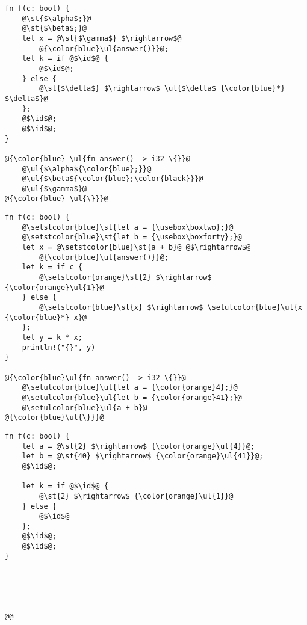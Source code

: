 \documentclass[a4paper,11pt]{article}
\newcommand\id{\square}
\begin{document}
\noindent
\begin{minipage}{.32\textwidth}
\begin{lstlisting}[rulecolor=\color{blue!20}]
fn f(c: bool) {
    @\st{$\alpha$;}@
    @\st{$\beta$;}@
    let x = @\st{$\gamma$} $\rightarrow$@
        @{\color{blue}\ul{answer()}}@;
    let k = if @$\id$@ {
        @$\id$@;
    } else {
        @\st{$\delta$} $\rightarrow$ \ul{$\delta$ {\color{blue}*} $\delta$}@
    };
    @$\id$@;
    @$\id$@;
}

@{\color{blue} \ul{fn answer() -> i32 \{}}@
    @\ul{$\alpha${\color{blue};}}@
    @\ul{$\beta${\color{blue};\color{black}}}@
    @\ul{$\gamma$}@
@{\color{blue} \ul{\}}}@
\end{lstlisting}
\end{minipage}\hfill
\begin{minipage}{.32\textwidth}
\newbox\boxtwo
\sbox{}
\newbox\boxforty
\sbox{}
\begin{lstlisting}
fn f(c: bool) {
    @\setstcolor{blue}\st{let a = {\usebox\boxtwo};}@
    @\setstcolor{blue}\st{let b = {\usebox\boxforty};}@
    let x = @\setstcolor{blue}\st{a + b}@ @$\rightarrow$@
        @{\color{blue}\ul{answer()}}@;
    let k = if c {
        @\setstcolor{orange}\st{2} $\rightarrow$ {\color{orange}\ul{1}}@
    } else {
        @\setstcolor{blue}\st{x} $\rightarrow$ \setulcolor{blue}\ul{x {\color{blue}*} x}@
    };
    let y = k * x;
    println!("{}", y)
}

@{\color{blue}\ul{fn answer() -> i32 \{}}@
    @\setulcolor{blue}\ul{let a = {\color{orange}4};}@
    @\setulcolor{blue}\ul{let b = {\color{orange}41};}@
    @\setulcolor{blue}\ul{a + b}@
@{\color{blue}\ul{\}}}@
\end{lstlisting}
\end{minipage}\hfill
\begin{minipage}{.32\textwidth}
\begin{lstlisting}[rulecolor=\color{orange!30}]
fn f(c: bool) {
    let a = @\st{2} $\rightarrow$ {\color{orange}\ul{4}}@;
    let b = @\st{40} $\rightarrow$ {\color{orange}\ul{41}}@;
    @$\id$@;

    let k = if @$\id$@ {
        @\st{2} $\rightarrow$ {\color{orange}\ul{1}}@
    } else {
        @$\id$@
    };
    @$\id$@;
    @$\id$@;
}





@@
\end{lstlisting}
\end{minipage}\hfill
\vspace{-.4cm}
\begin{lstlisting}[label=lst:overview_diffs, caption={Left (resp. right) represent the difference between original source code and blue commit (resp. orange commit). Center is the syntactic fusion of these two differences.}]
\end{lstlisting}
\end{document}
